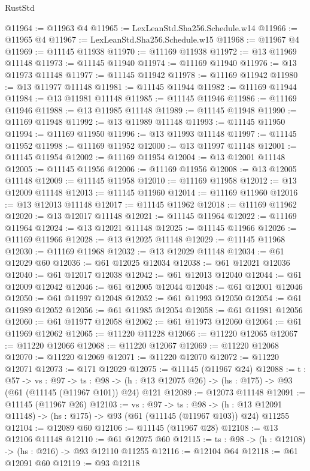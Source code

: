 \begin{lexlean}{RustStd}
\begin{coremodule}
@11964 := @11963 @4
@11965 := LexLeanStd.Sha256.Schedule.w14
@11966 := @11965 @4
@11967 := LexLeanStd.Sha256.Schedule.w15
@11968 := @11967 @4
@11969 := @11145 @11938
@11970 := @11169 @11938
@11972 := @13 @11969 @11148
@11973 := @11145 @11940
@11974 := @11169 @11940
@11976 := @13 @11973 @11148
@11977 := @11145 @11942
@11978 := @11169 @11942
@11980 := @13 @11977 @11148
@11981 := @11145 @11944
@11982 := @11169 @11944
@11984 := @13 @11981 @11148
@11985 := @11145 @11946
@11986 := @11169 @11946
@11988 := @13 @11985 @11148
@11989 := @11145 @11948
@11990 := @11169 @11948
@11992 := @13 @11989 @11148
@11993 := @11145 @11950
@11994 := @11169 @11950
@11996 := @13 @11993 @11148
@11997 := @11145 @11952
@11998 := @11169 @11952
@12000 := @13 @11997 @11148
@12001 := @11145 @11954
@12002 := @11169 @11954
@12004 := @13 @12001 @11148
@12005 := @11145 @11956
@12006 := @11169 @11956
@12008 := @13 @12005 @11148
@12009 := @11145 @11958
@12010 := @11169 @11958
@12012 := @13 @12009 @11148
@12013 := @11145 @11960
@12014 := @11169 @11960
@12016 := @13 @12013 @11148
@12017 := @11145 @11962
@12018 := @11169 @11962
@12020 := @13 @12017 @11148
@12021 := @11145 @11964
@12022 := @11169 @11964
@12024 := @13 @12021 @11148
@12025 := @11145 @11966
@12026 := @11169 @11966
@12028 := @13 @12025 @11148
@12029 := @11145 @11968
@12030 := @11169 @11968
@12032 := @13 @12029 @11148
@12034 := @61 @12029 @60
@12036 := @61 @12025 @12034
@12038 := @61 @12021 @12036
@12040 := @61 @12017 @12038
@12042 := @61 @12013 @12040
@12044 := @61 @12009 @12042
@12046 := @61 @12005 @12044
@12048 := @61 @12001 @12046
@12050 := @61 @11997 @12048
@12052 := @61 @11993 @12050
@12054 := @61 @11989 @12052
@12056 := @61 @11985 @12054
@12058 := @61 @11981 @12056
@12060 := @61 @11977 @12058
@12062 := @61 @11973 @12060
@12064 := @61 @11969 @12062
@12065 := @11220 @11228
@12066 := @11220 @12065
@12067 := @11220 @12066
@12068 := @11220 @12067
@12069 := @11220 @12068
@12070 := @11220 @12069
@12071 := @11220 @12070
@12072 := @11220 @12071
@12073 := @171 @12029
@12075 := @11145 (@11967 @24)
@12088 := {t : @57} ->
  {vs : @97} ->
  {ts : @98} -> (h : @13 @12075 @26) -> (hs : @175) -> @93 (@61 (@11145 (@11967 @101)) @24) @121
@12089 := @12073 @11148
@12091 := @11145 (@11967 @26)
@12103 := {vs : @97} ->
  {ts : @98} ->
  (h : @13 @12091 @11148) -> (hs : @175) -> @93 (@61 (@11145 (@11967 @103)) @24) @11255
@12104 := @12089 @60
@12106 := @11145 (@11967 @28)
@12108 := @13 @12106 @11148
@12110 := @61 @12075 @60
@12115 := {ts : @98} -> (h : @12108) -> (hs : @216) -> @93 @12110 @11255
@12116 := @12104 @64
@12118 := @61 @12091 @60
@12119 := @93 @12118

\end{coremodule}
\end{lexlean}
